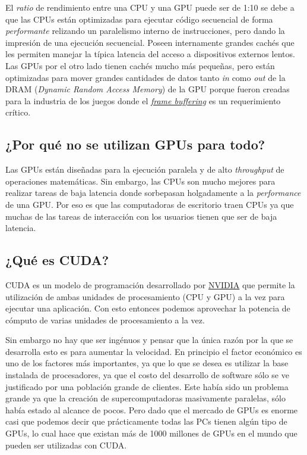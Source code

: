 El \textit{ratio} de rendimiento entre una CPU y una GPU puede ser de 1:10 se debe a que las CPUs están optimizadas para
ejecutar código secuencial de forma \textit{performante} relizando un paralelismo interno de instrucciones, pero dando
la impresión de una ejecución secuencial. Poseen internamente grandes cachés que les permiten manejar la típica latencia
del acceso a dispositivos externos lentos. Las GPUs por el otro lado tienen cachés mucho más pequeñas, pero están
optimizadas para mover grandes cantidades de datos tanto \textit{in} como \textit{out} de la DRAM (\textit{Dynamic
Random Access Memory}) de la GPU porque fueron creadas para la industria de los juegos donde el
\href{https://www.youtube.com/shorts/8wj3zVA03WQ}{\textit{frame buffering}} es un requerimiento crítico.  

\subsection*{¿Por qué no se utilizan GPUs para todo?}

Las GPUs están diseñadas para la ejecución paralela y de alto \textit{throughput} de operaciones matemáticas. Sin
embargo, las CPUs son mucho mejores para realizar tareas de baja latencia donde sorbepasan holgadamente a la
\textit{performance} de una GPU. Por eso es que las computadoras de escritorio traen CPUs ya que muchas de las tareas de
interacción con los usuarios tienen que ser de baja latencia.

\subsection*{¿Qué es CUDA?}

CUDA es un modelo de programación desarrollado por \href{https://www.nvidia.com/es-la/}{NVIDIA} que permite la
utilización de ambas unidades de procesamiento (CPU y GPU) a la vez para ejecutar una aplicación. Con esto entonces
podemos aprovechar la potencia de cómputo de varias unidades de procesamiento a la vez.

Sin embargo no hay que ser ingénuos y pensar que la única razón por la que se desarrolla esto es para aumentar la
velocidad. En principio el factor económico es uno de los factores más importantes, ya que lo que se desea es utilizar
la base instalada de procesadores, ya que el costo del desarrollo de software sólo se ve justificado por una población
grande de clientes. Este había sido un problema grande ya que la creación de supercomputadoras masivamente paralelas,
sólo había estado al alcance de pocos. Pero dado que el mercado de GPUs es enorme casi que podemos decir que
prácticamente todas las PCs tienen algún tipo de GPUs, lo cual hace que existan más de 1000 millones de GPUs en el mundo
que pueden ser utilizadas con CUDA.

